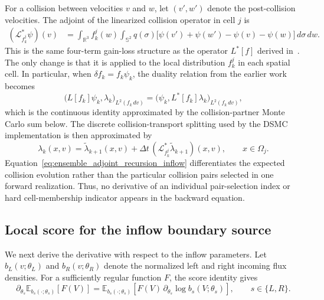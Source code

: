 \documentclass[12pt,nopreprintline]{elsarticle}
\begin{document}
For a collision between velocities $v$ and $w$, let $(v',w')$ denote the post-collision velocities. The adjoint of the linearized collision operator in cell $j$ is
\begin{align}
(\mathcal L_{f_k^j}^{*}\psi)(v)
&=
\int_{\mathbb R^3}f_k^j(w)
\int_{\mathbb S^2}q(\sigma)
\Big[
\psi(v')+\psi(w')-\psi(v)-\psi(w)
\Big]\,d\sigma\,dw.
\label{eq:ensemble_collision_adjoint_inflow}
\end{align}
This is the same four-term gain-loss structure as the operator $L^*[f]$ derived in~\cite{caflisch2021adjoint}. The only change is that it is applied to the local distribution $f_k^j$ in each spatial cell. In particular, when $\delta f_k=f_k\psi_k$, the duality relation from the earlier work becomes
\[
\bigl(L[f_k]\psi_k,\lambda_k\bigr)_{L^2(f_k\,dv)}
=
\bigl(\psi_k,L^*[f_k]\lambda_k\bigr)_{L^2(f_k\,dv)},
\]
which is the continuous identity approximated by the collision-partner Monte Carlo sum below. The discrete collision-transport splitting used by the DSMC implementation is then approximated by
\begin{equation}
\lambda_k(x,v)
=
\widetilde\lambda_{k+1}(x,v)
+\Delta t\,
(\mathcal L_{f_k^j}^{*}\widetilde\lambda_{k+1})(x,v),
\qquad x\in\Omega_j.
\label{eq:ensemble_adjoint_recursion_inflow}
\end{equation}
Equation~\eqref{eq:ensemble_adjoint_recursion_inflow} differentiates the expected collision evolution rather than the particular collision pairs selected in one forward realization. Thus, no derivative of an individual pair-selection index or hard cell-membership indicator appears in the backward equation.

\subsection{Local score for the inflow boundary source}

We next derive the derivative with respect to the inflow parameters. Let $b_L(v;\theta_L)$ and $b_R(v;\theta_R)$ denote the normalized left and right incoming flux densities. For a sufficiently regular function $F$, the score identity gives
\begin{equation}
\partial_{\theta_s}
\mathbb E_{b_s(\cdot;\theta_s)}[F(V)]
=
\mathbb E_{b_s(\cdot;\theta_s)}
\left[
F(V)\,\partial_{\theta_s}\log b_s(V;\theta_s)
\right],
\qquad s\in\{L,R\}.
\label{eq:local_score_identity_inflow}
\end{equation}
\end{document}
